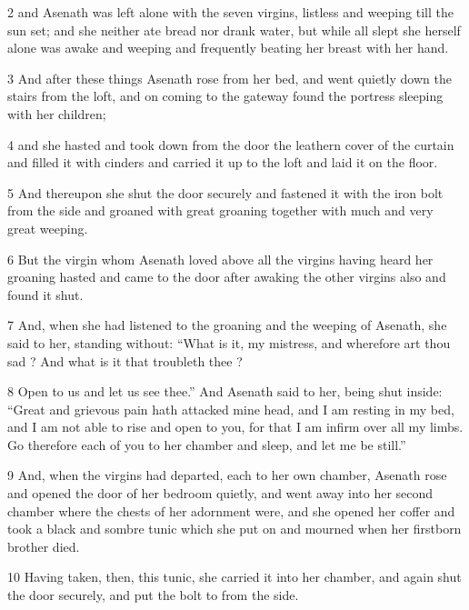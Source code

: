 \par 2 and Asenath was left alone with the seven virgins, listless and weeping till the sun set; and she neither ate bread nor drank water, but while all slept she herself alone was awake and weeping and frequently beating her breast with her hand. 

\par 3 And after these things Asenath rose from her bed, and went quietly down the stairs from the loft, and on coming to the gateway found the portress sleeping with her children; 

\par 4 and she hasted and took down from the door the leathern cover of the curtain and filled it with cinders and carried it up to the loft and laid it on the floor. 

\par 5 And thereupon she shut the door securely and fastened it with the iron bolt from the side and groaned with great groaning together with much and very great weeping. 

\par 6 But the virgin whom Asenath loved above all the virgins having heard her groaning hasted and came to the door after awaking the other virgins also and found it shut. 

\par 7 And, when she had listened to the groaning and the weeping of Asenath, she said to her, standing without: “What is it, my mistress, and wherefore art thou sad ? And what is it that troubleth thee ? 

\par 8 Open to us and let us see thee.” And Asenath said to her, being shut inside: “Great and grievous pain hath attacked mine head, and I am resting in my bed, and I am not able to rise and open to you, for that I am infirm over all my limbs. Go therefore each of you to her chamber and sleep, and let me be still.” 

\par 9 And, when the virgins had departed, each to her own chamber, Asenath rose and opened the door of her bedroom quietly, and went away into her second chamber where the chests of her adornment were, and she opened her coffer and took a black and sombre tunic which she put on and mourned when her firstborn brother died. 

\par 10 Having taken, then, this tunic, she carried it into her chamber, and again shut the door securely, and put the bolt to from the side. 

